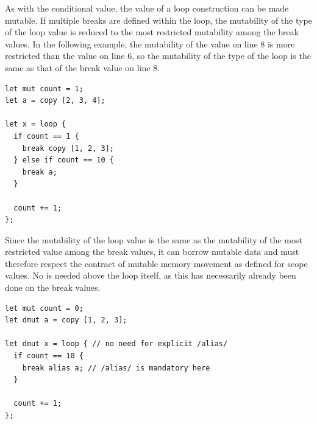 As with the conditional value, the value of a loop construction can be made
mutable. If multiple breaks are defined within the loop, the mutability of the
type of the loop value is reduced to the most restricted mutability among the
break values. In the following example, the mutability of the value on line 8 is
more restricted than the value on line 6, so the mutability of the type of the
loop is the same as that of the break value on line 8.

\begin{lstlisting}[style=coloredverbatim, escapechar=@]
let mut count = 1;
let a = copy [2, 3, 4];

let x = loop {
  if count == 1 {
    break copy [1, 2, 3];
  } else if count == 10 {
    break a;
  }

  count += 1;
};
\end{lstlisting}

Since the mutability of the loop value is the same as the mutability of the most
restricted value among the break values, it can borrow mutable data and must
therefore respect the contract of mutable memory movement as defined for scope
values. No  is needed above the loop itself, as this has
necessarily already been done on the break values.

\begin{lstlisting}[style=coloredverbatim, escapechar=@]
let mut count = 0;
let dmut a = copy [1, 2, 3];

let dmut x = loop { // no need for explicit /alias/
  if count == 10 {
    break alias a; // /alias/ is mandatory here
  }

  count += 1;
};
\end{lstlisting}

\vfill%
\pagebreak
